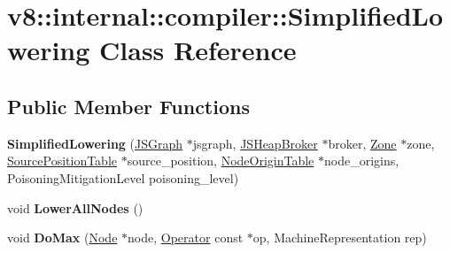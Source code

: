 \hypertarget{classv8_1_1internal_1_1compiler_1_1SimplifiedLowering}{}\section{v8\+:\+:internal\+:\+:compiler\+:\+:Simplified\+Lowering Class Reference}
\label{classv8_1_1internal_1_1compiler_1_1SimplifiedLowering}
\subsection*{Public Member Functions}
\begin{DoxyCompactItemize}
\item 
\mbox{\label{classv8_1_1internal_1_1compiler_1_1SimplifiedLowering_a8a060f1a82371ae9aa5cbc7d9a5a4224}} 
{\bfseries Simplified\+Lowering} (\mbox{\hyperlink{classv8_1_1internal_1_1compiler_1_1JSGraph}{J\+S\+Graph}} $\ast$jsgraph, \mbox{\hyperlink{classv8_1_1internal_1_1compiler_1_1JSHeapBroker}{J\+S\+Heap\+Broker}} $\ast$broker, \mbox{\hyperlink{classv8_1_1internal_1_1Zone}{Zone}} $\ast$zone, \mbox{\hyperlink{classv8_1_1internal_1_1compiler_1_1SourcePositionTable}{Source\+Position\+Table}} $\ast$source\+\_\+position, \mbox{\hyperlink{classv8_1_1internal_1_1compiler_1_1NodeOriginTable}{Node\+Origin\+Table}} $\ast$node\+\_\+origins, Poisoning\+Mitigation\+Level poisoning\+\_\+level)
\item 
\mbox{\label{classv8_1_1internal_1_1compiler_1_1SimplifiedLowering_aaa6438ebf75ae0cd397e843b3b9bc183}} 
void {\bfseries Lower\+All\+Nodes} ()
\item 
\mbox{\label{classv8_1_1internal_1_1compiler_1_1SimplifiedLowering_a79c31d9c5b1f14c40d62bfc1b164d2e5}} 
void {\bfseries Do\+Max} (\mbox{\hyperlink{classv8_1_1internal_1_1compiler_1_1Node}{Node}} $\ast$node, \mbox{\hyperlink{classv8_1_1internal_1_1compiler_1_1Operator}{Operator}} const $\ast$op, Machine\+Representation rep)
\item 
\mbox{\label{classv8_1_1internal_1_1compiler_1_1SimplifiedLowering_a68178dba4d910ef3870c29cdee9fb123}} 

\end{DoxyCompactItemize}

